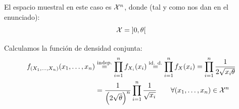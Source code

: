 \begin{ejercicio}
\begin{enumerate}[label=\alph*)]
            El espacio muestral en este caso es $\mathcal{X}^n$, donde (tal y como nos dan en el enunciado):
            \begin{equation*}
                \mathcal{X} = \left]0,\theta\right[
            \end{equation*}
            
            Calculamos la función de densidad conjunta:
            \begin{align*}
                f_{(X_1, \ldots, X_n)}(x_1, \ldots, x_n) &\stackrel{\text{indep.}}{=} \prod_{i=1}^{n} f_{X_i}(x_i) \stackrel{\text{id. d.}}{=} \prod_{i=1}^{n} f_X(x_i) 
                = \prod_{i=1}^{n} \dfrac{1}{2\sqrt{x_i \theta}} \\
                                                         &= \dfrac{1}{{\left(2\sqrt{\theta}\right)}^{n}} \prod_{i=1}^{n} \dfrac{1}{\sqrt{x_i}} \qquad \forall (x_1, \ldots, x_n) \in  \mathcal{X}^n
            \end{align*}
    \end{enumerate}
\end{ejercicio}

